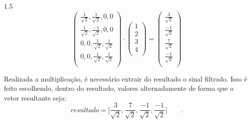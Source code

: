 \documentclass[a4paper,12pt,openright,oneside]{book}
\newenvironment{myenv}[1]
{\begin{spacing}{#1}}
	{\end{spacing}}
\begin{document}
\begin{myenv}{1.5}
\begin{equation}
\begin{pmatrix}
\frac{1}{\sqrt{2}}, \frac{1}{\sqrt{2}}, 0, 0\\
\frac{1}{\sqrt{2}}, \frac{-1}{\sqrt{2}}, 0, 0\\
0, 0, \frac{1}{\sqrt{2}}, \frac{1}{\sqrt{2}}\\
0, 0, \frac{1}{\sqrt{2}}, \frac{1}{\sqrt{2}}\\
\end{pmatrix} 
\cdot
\begin{pmatrix}
1\\
2\\
3\\
4\\
\end{pmatrix} 
=
\begin{pmatrix}
\frac{3}{\sqrt{2}}\\
\frac{-1}{\sqrt{2}}\\
\frac{7}{\sqrt{2}}\\
\frac{-1}{\sqrt{2}}\\
\end{pmatrix}
\end{equation}
\par Realizada a multiplicação, é necessário extrair do resultado o sinal filtrado. Isso é feito escolhendo, dentro do resultado, valores alternadamente de forma que o vetor resultante seja:
\begin{equation}
resultado = \Big[
\frac{3}{\sqrt{2}},
\frac{7}{\sqrt{2}},
\frac{-1}{\sqrt{2}},
\frac{-1}{\sqrt{2}}
\Big]\qquad.
\end{equation}


\end{myenv}
\end{document}
